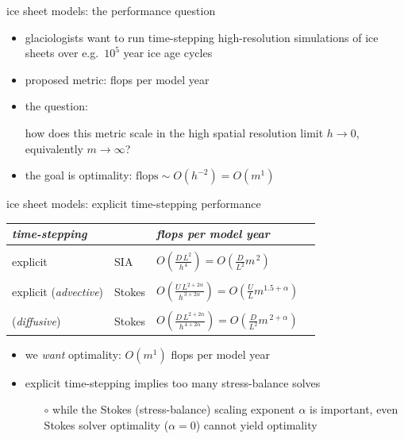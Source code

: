 \documentclass[svgnames,
               hyperref={colorlinks,citecolor=DeepPink4,linkcolor=FireBrick,urlcolor=Maroon},
               usepdftitle=false]  %
               {beamer}
\newcommand{\oo}[1]{\displaystyle O\left(#1\right)}
\begin{document}
\begin{frame}{ice sheet models: the performance question}

\begin{itemize}
\item glaciologists want to run time-stepping high-resolution simulations of ice sheets over e.g.~$10^5$ year ice age cycles

\bigskip
\item proposed metric: \quad \alert{flops per model year}

\bigskip
\item the question:

\bigskip
\begin{center}
\begin{minipage}{0.82\textwidth}
how does this metric \alert{scale} in the \alert{high spatial resolution limit} $h\to 0$, equivalently $m\to \infty$?
\end{minipage}
\end{center}

\bigskip
\item the goal is optimality: \hspace{20mm} $\text{flops} \sim O(h^{-2}) = O(m^1)$
\end{itemize}
\end{frame}


\begin{frame}{ice sheet models: explicit time-stepping performance}

\begin{tabular}{llll}
\emph{time-stepping} &  & \emph{flops per model year} \\ \hline
\\
explicit & SIA    & $\oo{\frac{D\, L^2}{h^{\,4}}} = \oo{\frac{D}{L^2} m^{\,2}}$ \\
\\
explicit ({\footnotesize \emph{advective}}) & Stokes \phantom{xxxx} & $\oo{\frac{U \,L^{2+2\alpha}}{h^{\,3+2\alpha}}} = \oo{\frac{U}{L} m^{1.5+\alpha}}$ \\
\\
\phantom{explicit} ({\footnotesize \emph{diffusive}})  & Stokes & $\oo{\frac{D\, L^{2+2\alpha}}{h^{\,4+2\alpha}}} = \oo{\frac{D}{L^2} m^{\,2+\alpha}}$
\end{tabular}


\vspace{10mm}
\begin{itemize}
\item we \emph{want} optimality: \quad $O(m^1)$ flops per model year
\item explicit time-stepping implies \alert{too many stress-balance solves}
    \begin{itemize}
    \item[$\circ$] while the Stokes (stress-balance) scaling exponent $\alpha$ is important, even Stokes solver optimality ($\alpha=0$) cannot yield optimality
    \end{itemize}
\end{itemize}
\end{frame}
\end{document}
